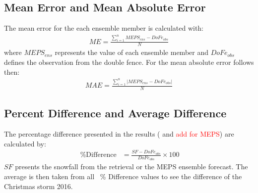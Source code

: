 \subsection{Mean Error and Mean Absolute Error}
The mean error for the each ensemble member is calculated with: 
\begin{align}
	ME = \frac{\sum_{i=1}^n MEPS_{ens} - DoFe_{obs}}{N}
\end{align}
where $MEPS_{ens}$ represents the value of each ensemble member and $DoFe_{obs}$ defines the observation from the double fence. For the mean absolute error follows then:
\begin{align}
	MAE = \frac{\sum_{i=1}^n \left| MEPS_{ens} - DoFe_{obs}\right|}{N} \label{eq:MAE}
\end{align}

\subsection{Percent Difference and Average Difference}
The percentage difference presented in the results ( and \textcolor{red}{add for MEPS}) are calculated by:
\begin{align}
	\SI{}{\percent} \text{Difference} & = \frac{SF - DoFe_{obs}}{DoFe_{obs}} \times 100
\end{align}
$SF$ presents the snowfall from the retrieval or the MEPS ensemble forecast. The average is then taken from all \SI{}{\percent} Difference values to see the difference of the Christmas storm 2016.

